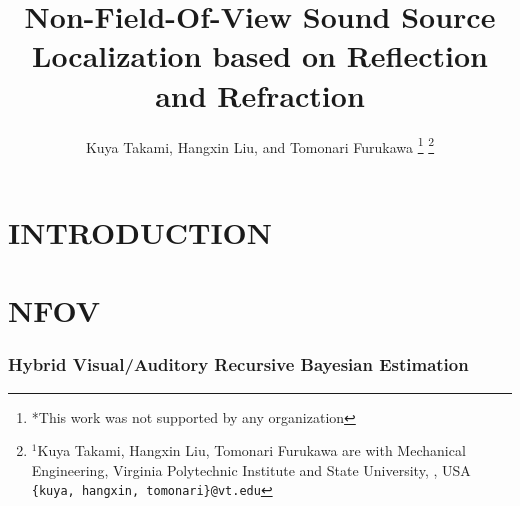 \documentclass[letterpaper, 10 pt, conference]{ieeeconf}  %
\title{\LARGE \bf
Non-Field-Of-View Sound Source Localization based on Reflection and Refraction
}
\author{Kuya Takami, Hangxin Liu, and Tomonari Furukawa%
\thanks{*This work was not supported by any organization}%
\thanks{$^{1}$Kuya Takami, Hangxin Liu, Tomonari Furukawa are with Mechanical Engineering, Virginia Polytechnic Institute and State University, , USA
        {\tt\small \{kuya, hangxin, tomonari\}@vt.edu}}%
}
\begin{document}
\maketitle
\thispagestyle{empty}
\pagestyle{empty}


\begin{abstract}

\end{abstract}


\section{INTRODUCTION}

\section{NFOV }
	\subsubsection{Hybrid Visual/Auditory Recursive Bayesian Estimation}
\end{document}
